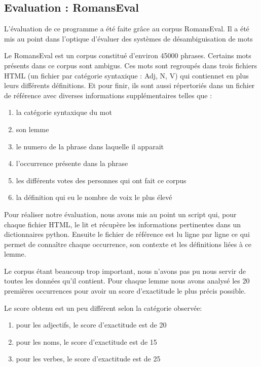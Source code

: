 \subsection{Evaluation : RomansEval}

L'évaluation de ce programme a été faite grâce au corpus RomansEval. Il a été 
mis au point dans l'optique d'évaluer des systèmes de désambiguisation de mots

Le RomansEval est un corpus constitué d'environ 45000 phrases. Certains mots 
présents dans ce corpus sont ambigus. Ces mots sont regroupés dans trois 
fichiers HTML (un fichier par catégorie syntaxique : Adj, N, V) qui contiennet 
en plus leurs différents définitions. Et pour finir, ils sont aussi répertoriés 
dans un fichier de référence avec diverses informations supplémentaires telles 
que :

\begin{enumerate}
 \item la catégorie syntaxique du mot
 \item son lemme
 \item le numero de la phrase dans laquelle il apparait
 \item l'occurrence présente dans la phrase
 \item les différents votes des personnes qui ont fait ce corpus
 \item la définition qui eu le nombre de voix le plus élevé
 \end{enumerate}

Pour réaliser notre évaluation, nous avons mis au point un script qui, pour 
chaque fichier HTML, le lit et récupère les informations pertinentes dans un 
dictionnaires python. Ensuite le fichier de référence est lu ligne par ligne 
ce qui permet de connaître chaque occurrence, son contexte et les définitions 
liées à ce lemme.

Le corpus étant beaucoup trop important, nous n'avons pas pu nous servir de 
toutes les données qu'il contient. Pour chaque lemme nous avons analysé les 20 
premières occurrences pour avoir un score d'exactitude le plus précis possible.

Le score obtenu est un peu différent selon la catégorie observée:

\begin{enumerate}
 \item pour les adjectifs, le score d'exactitude est de 20%
 \item pour les noms, le score d'exactitude est de 15%
 \item pour les verbes, le score d'exactitude est de 25%
\end{enumerate}

